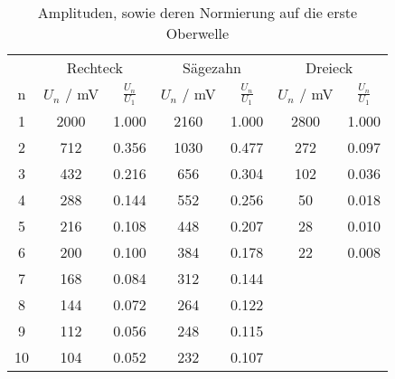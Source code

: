 \begin{table}[!htp]
\centering
\caption{Amplituden, sowie deren Normierung auf die erste Oberwelle}
\label{tab:amplituden}
\begin{tabular}{c c c c c c c }
\toprule
& \multicolumn{2}{c}{Rechteck} &  \multicolumn{2}{c}{Sägezahn} & \multicolumn{2}{c}{Dreieck} \\
 \cmidrule(lr){2-3} 
  \cmidrule(lr){4-5}
   \cmidrule(lr){6-7}
{n} & {$U_n$ / mV} & {$\frac{U_n}{U_1}$} & {$U_n$ / mV} & {$\frac{U_n}{U_1}$} & {$U_n$ / mV} & {$\frac{U_n}{U_1}$}  \\
\midrule
1 & 2000 & 1.000 & 2160 & 1.000 & 2800  & 1.000  \\
2 & 712 & 0.356  & 1030 & 0.477 & 272 & 0.097 \\
3 & 432 & 0.216  & 656 & 0.304 & 102 & 0.036 \\
4 & 288 & 0.144  & 552 & 0.256 & 50 & 0.018 \\
5 & 216 & 0.108  & 448 & 0.207 & 28 & 0.010 \\
6 & 200 & 0.100  & 384 & 0.178 & 22 & 0.008 \\
7 & 168 & 0.084  & 312 & 0.144 &    &  \\
8 & 144 & 0.072  & 264 & 0.122 &    &  \\
9 & 112 & 0.056  & 248 & 0.115 &    &  \\
10 & 104 & 0.052 & 232 & 0.107 &    &  \\
\bottomrule
\end{tabular}
\end{table}